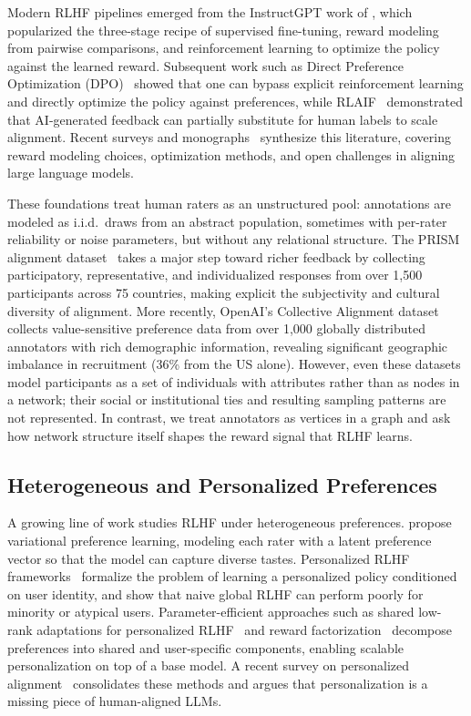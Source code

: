 \documentclass{article}
\theoremstyle{plain}
\theoremstyle{definition}
\theoremstyle{remark}
\begin{document}
Modern RLHF pipelines emerged from the InstructGPT work of \citet{ouyang2022instructgpt}, which popularized the three-stage recipe of supervised fine-tuning, reward modeling from pairwise comparisons, and reinforcement learning to optimize the policy against the learned reward.
Subsequent work such as Direct Preference Optimization (DPO)~\citep{rafailov2023dpo} showed that one can bypass explicit reinforcement learning and directly optimize the policy against preferences, while RLAIF~\citep{lee2024rlaif} demonstrated that AI-generated feedback can partially substitute for human labels to scale alignment.
Recent surveys and monographs~\citep{kaufmann2025survey,lambert2025rlhfbook,shen2023llmalignment} synthesize this literature, covering reward modeling choices, optimization methods, and open challenges in aligning large language models.

These foundations treat human raters as an unstructured pool: annotations are modeled as i.i.d.\ draws from an abstract population, sometimes with per-rater reliability or noise parameters, but without any relational structure.
The PRISM alignment dataset~\citep{kirk2024prism} takes a major step toward richer feedback by collecting participatory, representative, and individualized responses from over 1{,}500 participants across 75 countries, making explicit the subjectivity and cultural diversity of alignment.
More recently, OpenAI's Collective Alignment dataset~\citep{openai2025ca1} collects value-sensitive preference data from over 1{,}000 globally distributed annotators with rich demographic information, revealing significant geographic imbalance in recruitment (36\% from the US alone).
However, even these datasets model participants as a set of individuals with attributes rather than as nodes in a network; their social or institutional ties and resulting sampling patterns are not represented.
In contrast, we treat annotators as vertices in a graph and ask how network structure itself shapes the reward signal that RLHF learns.

\subsection{Heterogeneous and Personalized Preferences}
\label{sec:rw_personalized}

A growing line of work studies RLHF under heterogeneous preferences.
\citet{poddar2024vpl} propose variational preference learning, modeling each rater with a latent preference vector so that the model can capture diverse tastes.
Personalized RLHF frameworks~\citep{li2024personalized_rlhf} formalize the problem of learning a personalized policy conditioned on user identity, and show that naive global RLHF can perform poorly for minority or atypical users.
Parameter-efficient approaches such as shared low-rank adaptations for personalized RLHF~\citep{liu2025shared_lora_prlhf} and reward factorization~\citep{shenfeld2025reward_factorization} decompose preferences into shared and user-specific components, enabling scalable personalization on top of a base model.
A recent survey on personalized alignment~\citep{guan2025personalized_alignment_survey} consolidates these methods and argues that personalization is a missing piece of human-aligned LLMs.
\end{document}
